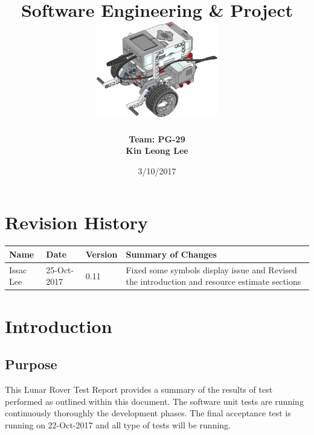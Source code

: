 \documentclass[10pt,a4paper,titlepage]{article}
\begin{document}
	
	\begin{titlepage}
		
		\title{
			\fontsize{50}{12}\\
			\vspace{20pt}
			\fontsize{20}{12}\\
			\vspace{10pt}
			\large{Software Engineering \& Project} \\
			\vspace{20pt}
			\includegraphics[width=200px]{title-page-ev3.png}					
		}
		\date{3/10/2017}
		\author{
			\bf{Team: PG-29} \\
			Kin Leong Lee \\
		}
		
	\end{titlepage}
		 
	\tableofcontents	
	\listoftables
		
	\section*{Revision History}	
	\label{revtable}	
	\begin{tabular}{|p{2.1cm}|p{2.5cm}|p{2cm}|p{4.1cm}|}		
		\hline 
		\textbf {Name} & \textbf{Date} & \textbf {Version} &\textbf {Summary of Changes} \\ \hline
		Issac Lee & 25-Oct-2017 & 0.11 & Fixed some symbols display issue and Revised the introduction and resource estimate sections\\ \hline
		\hline 
		\hline 		
	\end{tabular}

	\newpage	
	\section{Introduction}
		\subsection{Purpose}
		This Lunar Rover Test Report provides a summary of the results of test performed as outlined within this document. The software unit tests are running continuously thoroughly the development phases. The final acceptance test is running on 22-Oct-2017 and all type of tests will be running.
	
\end{document}
